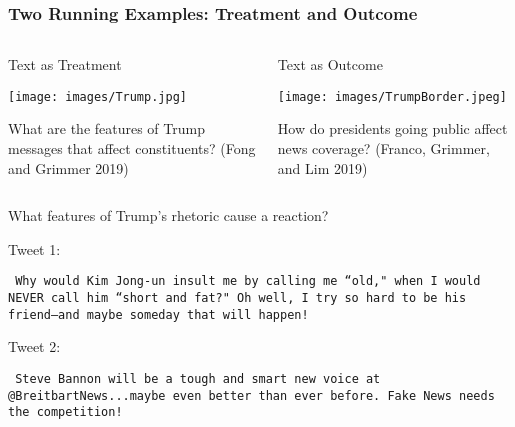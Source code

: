 \documentclass[xcolor=dvipsnames]{beamer}
\begin{document}
\begin{frame}
\frametitle{Two Running Examples: Treatment and Outcome}

\pause
\begin{columns}[c]
\begin{column}{.5\textwidth}
\begin{framed}
Text as \alert{Treatment} \\
\begin{center}
\texttt{[image: images/Trump.jpg]}
\end{center}

What are the features of Trump messages that affect constituents? (Fong and Grimmer 2019)
\end{framed}
\end{column} \pause
\begin{column}{.5\textwidth}
\begin{framed}
Text as \alert{Outcome} \\
\begin{center}
\texttt{[image: images/TrumpBorder.jpeg]}
\end{center}

How do presidents going public affect news coverage? (Franco, Grimmer, and Lim 2019)
\end{framed}
\end{column}
\end{columns}
\end{frame}



\begin{frame}
\huge
What features of Trump's rhetoric cause a reaction? 
\end{frame}



\begin{frame}



\end{frame}


\begin{frame}

  \alert{Tweet 1: }

  {\tt
  Why would Kim Jong-un insult me by calling me ``old," when I would NEVER call him ``short and fat?" Oh well, I try so hard to be his friend--and maybe someday that will happen!
  }
  \vspace{0.25in}

  \alert{Tweet 2: }

  {\tt
  Steve Bannon will be a tough and smart new voice at @BreitbartNews...maybe even better than ever before. Fake News needs the competition!
  } \\

  \vspace{0.25in}

\pause
  \Large
   \pause {}

\end{frame}
\end{document}
